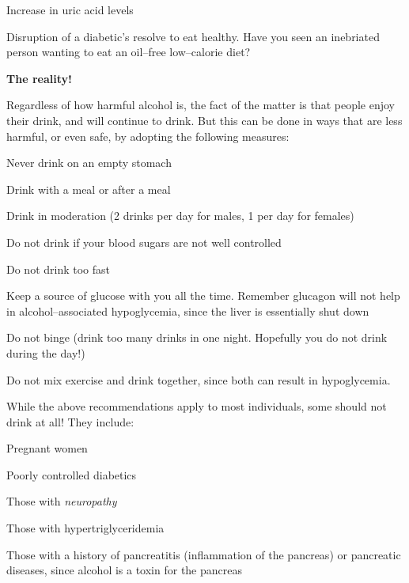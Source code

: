  \item Increase in uric acid levels

 \item Disruption of a diabetic’s resolve to eat healthy. Have you seen an inebriated person wanting to eat an oil–free low–calorie diet?

\textbf{The reality!}

Regardless of how harmful alcohol is, the fact of the matter is that people enjoy their drink, and will continue to drink. But this can be done in ways that are less harmful, or even safe, by adopting the following measures:

\item Never drink on an empty stomach

 \item Drink with a meal or after a meal

 \item Drink in moderation (2 drinks per day for males, 1 per day for females)

 \item Do not drink if your blood sugars are not well controlled

 \item Do not drink too fast

 \item Keep a source of glucose with you all the time. Remember glucagon will not help in alcohol–associated hypoglycemia, since the liver is essentially shut down

 \item Do not binge (drink too many drinks in one night. Hopefully you do not drink during the day!)

 \item Do not mix exercise and drink together, since both can result in hypoglycemia.

While the above recommendations apply to most individuals, some should not drink at all! They include:

\item Pregnant women

 \item Poorly controlled diabetics

 \item Those with \textit{neuropathy}

 \item Those with hypertriglyceridemia

 \item Those with a history of pancreatitis (inflammation of the pancreas) or pancreatic diseases, since alcohol is a toxin for the pancreas

